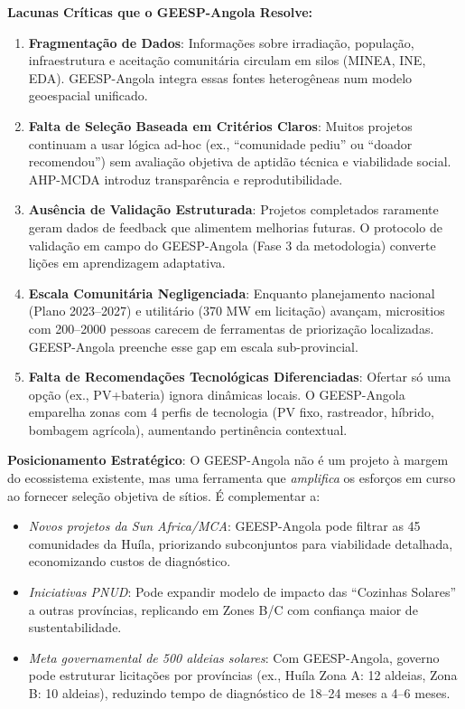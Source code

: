 \documentclass[12pt, a4paper]{article}
\begin{document}
\textbf{Lacunas Críticas que o GEESP-Angola Resolve:}
\begin{enumerate}
\item \textbf{Fragmentação de Dados}: Informações sobre irradiação, população, infraestrutura e aceitação comunitária circulam em silos (MINEA, INE, EDA). GEESP-Angola integra essas fontes heterogêneas num modelo geoespacial unificado.
\item \textbf{Falta de Seleção Baseada em Critérios Claros}: Muitos projetos continuam a usar lógica ad-hoc (ex., ``comunidade pediu'' ou ``doador recomendou'') sem avaliação objetiva de aptidão técnica e viabilidade social. AHP-MCDA introduz transparência e reprodutibilidade.
\item \textbf{Ausência de Validação Estruturada}: Projetos completados raramente geram dados de feedback que alimentem melhorias futuras. O protocolo de validação em campo do GEESP-Angola (Fase 3 da metodologia) converte lições em aprendizagem adaptativa.
\item \textbf{Escala Comunitária Negligenciada}: Enquanto planejamento nacional (Plano 2023–2027) e utilitário (370 MW em licitação) avançam, micrositios com 200--2000 pessoas carecem de ferramentas de priorização localizadas. GEESP-Angola preenche esse gap em escala sub-provincial.
\item \textbf{Falta de Recomendações Tecnológicas Diferenciadas}: Ofertar só uma opção (ex., PV+bateria) ignora dinâmicas locais. O GEESP-Angola emparelha zonas com 4 perfis de tecnologia (PV fixo, rastreador, híbrido, bombagem agrícola), aumentando pertinência contextual.
\end{enumerate}

\textbf{Posicionamento Estratégico}: O GEESP-Angola não é um projeto à margem do ecossistema existente, mas uma ferramenta que \textit{amplifica} os esforços em curso ao fornecer seleção objetiva de sítios. É complementar a:
\begin{itemize}
\item \textit{Novos projetos da Sun Africa/MCA}: GEESP-Angola pode filtrar as 45 comunidades da Huíla, priorizando subconjuntos para viabilidade detalhada, economizando custos de diagnóstico.
\item \textit{Iniciativas PNUD}: Pode expandir modelo de impacto das ``Cozinhas Solares'' a outras províncias, replicando em Zones B/C com confiança maior de sustentabilidade.
\item \textit{Meta governamental de 500 aldeias solares}: Com GEESP-Angola, governo pode estruturar licitações por províncias (ex., Huíla Zona A: 12 aldeias, Zona B: 10 aldeias), reduzindo tempo de diagnóstico de 18--24 meses a 4--6 meses.
\end{itemize}
\end{document}
